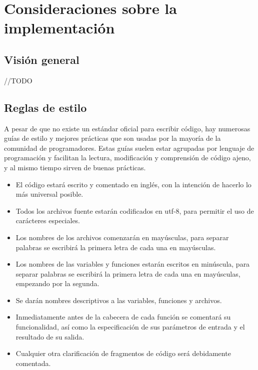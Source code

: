 \chapter{Consideraciones sobre la implementación}

\section{Visión general}

//TODO

\section{Reglas de estilo}

	A pesar de que no existe un estándar oficial para escribir código, hay numerosas guías de estilo y mejores prácticas que son usadas por la mayoría de la comunidad de programadores. Estas guías suelen estar agrupadas por lenguaje de programación y facilitan la lectura, modificación y comprensión de código ajeno, y al mismo tiempo sirven de buenas prácticas.

	\begin{itemize}
		\item El código estará escrito y comentado en inglés, con la intención de hacerlo lo más universal posible.

		\item Todos los archivos fuente estarán codificados en \acrshort{utf}-8, para permitir el uso de carácteres especiales.

		\item Los nombres de los archivos comenzarán en mayúsculas, para separar palabras se escribirá la primera letra de cada una en mayúsculas.

		\item Los nombres de las variables y funciones estarán escritos en minúscula, para separar palabras se escribirá la primera letra de cada una en mayúsculas, empezando por la segunda.

		\item Se darán nombres descriptivos a las variables, funciones y archivos.

		\item Inmediatamente antes de la cabecera de cada función se comentará su funcionalidad, así como la especificación de sus parámetros de entrada y el resultado de su salida.

		\item Cualquier otra clarificación de fragmentos de código será debidamente comentada.
	\end{itemize}

